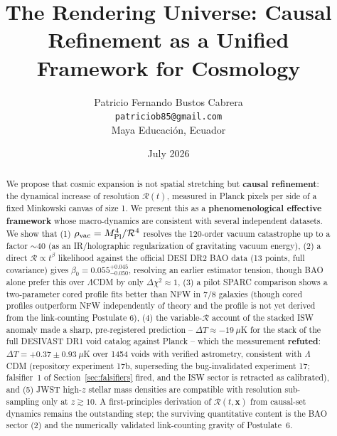 \documentclass[12pt]{article}
\title{The Rendering Universe: Causal Refinement as a Unified Framework for Cosmology}
\author{Patricio Fernando Bustos Cabrera\\
  \texttt{patriciob85@gmail.com}\\
  Maya Educaci\'on, Ecuador}
\date{July 2026}
\begin{document}
\maketitle

\begin{center}
\end{center}

\begin{abstract}
We propose that cosmic expansion is not spatial stretching but {\bf causal refinement}: the dynamical increase of resolution $\mathcal{R}(t)$, measured in Planck pixels per side of a fixed Minkowski canvas of size 1. We present this as a {\bf phenomenological effective framework} whose macro-dynamics are consistent with several independent datasets. We show that (1) $\rho_{\rm vac} = M_{\rm Pl}^4 / \mathcal{R}^4$ resolves the 120-order vacuum catastrophe up to a factor $\sim40$ (as an IR/holographic regularization of gravitating vacuum energy), (2) a direct $\mathcal{R}\propto t^{\beta}$ likelihood against the official DESI DR2 BAO data (13 points, full covariance) gives $\beta_0 = 0.055^{+0.045}_{-0.050}$, resolving an earlier estimator tension, though BAO alone prefer this over $\Lambda$CDM by only $\Delta\chi^2\approx1$, (3) a pilot SPARC comparison shows a two-parameter cored profile fits better than NFW in 7/8 galaxies (though cored profiles outperform NFW independently of theory and the profile is not yet derived from the link-counting Postulate 6), (4) the variable-$\mathcal{R}$ account of the stacked ISW anomaly made a sharp, pre-registered prediction -- $\Delta T \approx -19\ \mu$K for the stack of the full DESIVAST DR1 void catalog against Planck -- which the measurement {\bf refuted}: $\Delta T = +0.37 \pm 0.93\ \mu$K over 1454 voids with verified astrometry, consistent with $\Lambda$CDM (repository experiment 17b, superseding the bug-invalidated experiment 17; falsifier~1 of Section~\ref{sec:falsifiers} fired, and the ISW sector is retracted as calibrated), and (5) JWST high-$z$ stellar mass densities are compatible with resolution sub-sampling only at $z \gtrsim 10$. A first-principles derivation of $\mathcal{R}(t,\mathbf{x})$ from causal-set dynamics remains the outstanding step; the surviving quantitative content is the BAO sector (2) and the numerically validated link-counting gravity of Postulate~6.
\end{abstract}
\end{document}
